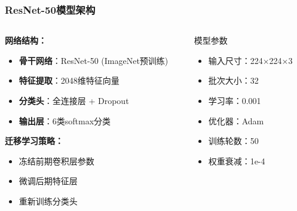 \documentclass[10pt]{beamer}
\begin{document}
\begin{frame}
\frametitle{ResNet-50模型架构}
\begin{columns}
\begin{column}{0.6\textwidth}
\textbf{网络结构：}
\begin{itemize}
    \item \textbf{骨干网络}：ResNet-50 (ImageNet预训练)
    \item \textbf{特征提取}：2048维特征向量
    \item \textbf{分类头}：全连接层 + Dropout
    \item \textbf{输出层}：6类softmax分类
\end{itemize}

\vspace{0.3cm}
\textbf{迁移学习策略：}
\begin{itemize}
    \item 冻结前期卷积层参数
    \item 微调后期特征层
    \item 重新训练分类头
\end{itemize}
\end{column}

\begin{column}{0.4\textwidth}
\begin{block}{模型参数}
\small
\begin{itemize}
    \item 输入尺寸：224×224×3
    \item 批次大小：32
    \item 学习率：0.001
    \item 优化器：Adam
    \item 训练轮数：50
    \item 权重衰减：1e-4
\end{itemize}
\end{block}
\end{column}
\end{columns}
\end{frame}
\end{document}
